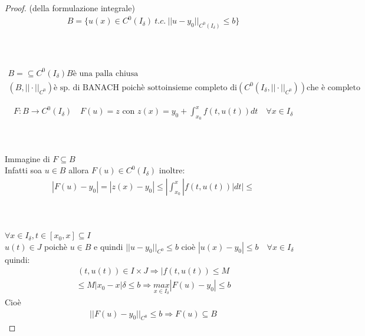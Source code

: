\documentclass[a4paper, oneside]{article}
\begin{document}
    \begin{proof}
        (della formulazione integrale)
        \begin{gather*}
            B = \{u(x) \in C^0(I_\delta) \ t.c. \ || u-y_0||_{C^0 (I_\delta)}\leq b\}\\
        \end{gather*}

    \hfil\\
    \\
    \begin{gather*}
        B =\subseteq C^0 (I_\delta) B \text{è una palla chiusa}\\
        (B,||\cdot||_{C^0}) \text{è sp. di BANACH poichè sottoinsieme completo di} (C^0(I_\delta, || \cdot ||_{C^0})) \text{che è completo}
    \end{gather*}

    \begin{gather*}
        F:B \to C^0(I_\delta) \quad F(u) = z \text{ con } z(x) = y_0 + \int_{x_0}^{x} f(t,u(t)) dt \quad \forall x \in I_\delta
    \end{gather*}
    
    \hfil\\
    \\
    Immagine di $F \subseteq B$\\
    Infatti soa $u \in B$ allora $F(u) \in C^0 (I_\delta)$ inoltre:
    \begin{gather*}
        |F(u) -y_0| = |z(x) -y_0| \leq |\int_{x_0}^{x} |f(t, u(t))| dt |\leq
    \end{gather*}

    \hfil\\
    \\
    $\forall x \in I_\delta , t \in [x_0, x] \subseteq I$\\
    $u(t) \in J$ poichè $u \in B $ e quindi $||u-y_0||_{C^0} \leq b$ cioè $|u(x)-y_0| \leq b \quad \forall x \in I_\delta$\\
    quindi:
    \begin{gather*}
        (t, u(t)) \in I \times J \Rightarrow |f(t, u(t)) \leq M
    \end{gather*}
    \begin{gather*}
        \leq M |x_0-x| \delta \leq b \Rightarrow \underset{x \in I_\delta}{max} |F(u) - y_0| \leq b
    \end{gather*}
    Cioè
    \begin{gather*}
        ||F(u) - y_0||_{C^0} \leq b \Rightarrow F(u) \subseteq B
    \end{gather*}


\end{proof}
\end{document}
